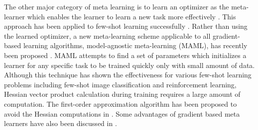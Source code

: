 \documentclass{article}
\begin{document}

The other major category of meta learning is to learn an optimizer 
as the meta-learner which enables the learner to learn a new task more effectively \cite{Hochreiter:2001:DBLP:conf/icann/HochreiterYC01, Andrychowicz:nips2016:DBLP:conf/nips/AndrychowiczDCH16}. 
This approach has been applied to few-shot learning successfully \cite{ravi:opt_fewshot:DBLP:conf/iclr/RaviL17}. 
Rather than using the learned optimizer, a new meta-learning scheme applicable 
to all gradient-based learning algorithms, model-agnostic meta-learning (MAML), has recently been proposed \cite{finn:maml:DBLP:conf/icml/FinnAL17}. MAML attempts to find a set of parameters which initializes 
a learner for any specific task to be trained quickly only with small amount of data. 
Although this technique has shown the effectiveness for various few-shot learning problems including few-shot image classification and reinforcement learning, Hessian vector product calculation during training requires a 
large amount of computation. The first-order approximation algorithm has been proposed to avoid the Hessian computations in \cite{nichol:reptile:DBLP:journals/corr/abs-1803-02999}. Some advantages of gradient based meta learners have also
been discussed in \cite{finn:universality_maml:DBLP:/journals/corr/abs-1710-11622}.
\end{document}
